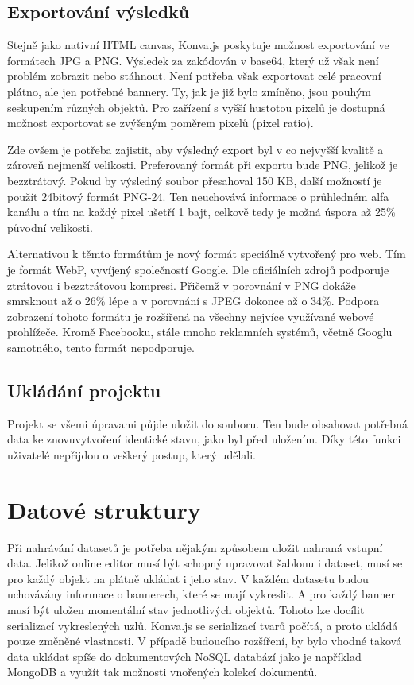         \subsection{Exportování výsledků}
        Stejně jako nativní HTML canvas, Konva.js poskytuje možnost exportování ve formátech JPG a PNG.
        Výsledek za zakódován v base64, který už však není problém zobrazit nebo stáhnout.
        Není potřeba však exportovat celé pracovní plátno, ale jen potřebné bannery. Ty, jak je již bylo zmíněno,
        jsou pouhým seskupením různých objektů. Pro zařízení s vyšší hustotou pixelů je dostupná možnost exportovat se zvýšeným poměrem pixelů (pixel ratio). 

        Zde ovšem je potřeba zajistit, aby výsledný export byl v co nejvyšší kvalitě a zároveň nejmenší velikosti.
        Preferovaný formát při exportu bude PNG, jelikož je bezztrátový. Pokud by výsledný soubor přesahoval 150 KB,
        další možností je použít 24bitový formát PNG-24.
        Ten neuchovává informace o průhledném alfa kanálu a tím na každý pixel ušetří 1 bajt, celkově tedy je možná úspora až 25\% původní velikosti. 

        Alternativou k těmto formátům je nový formát speciálně vytvořený pro web. Tím je formát WebP, vyvíjený společností Google.
        Dle oficiálních zdrojů podporuje ztrátovou i bezztrátovou kompresi. Přičemž v porovnání v PNG dokáže smrsknout až o 26\% lépe a v porovnání
        s JPEG dokonce až o 34\%. Podpora zobrazení tohoto formátu je rozšířená na všechny nejvíce využívané webové prohlížeče.
        Kromě Facebooku, stále mnoho reklamních systémů, včetně Googlu samotného, tento formát nepodporuje.

        \subsection{Ukládání projektu}
        Projekt se všemi úpravami půjde uložit do souboru. Ten bude obsahovat potřebná data ke znovuvytvoření identické stavu, jako byl před uložením.
        Díky této funkci uživatelé nepřijdou o veškerý postup, který udělali.

    \section{Datové struktury}
    Při nahrávání datasetů je potřeba nějakým způsobem uložit nahraná vstupní data. Jelikož online editor musí být schopný upravovat šablonu i dataset,
    musí se pro každý objekt na plátně ukládat i jeho stav. V každém datasetu budou uchovávány informace o bannerech, které se mají vykreslit.
    A pro každý banner musí být uložen momentální stav jednotlivých objektů. Tohoto lze docílit serializací vykreslených uzlů.
    Konva.js se serializací tvarů počítá, a proto ukládá pouze změněné vlastnosti. V případě budoucího rozšíření, by bylo vhodné taková data ukládat spíše do
    dokumentových NoSQL databází jako je například MongoDB a využít tak možnosti vnořených kolekcí dokumentů. 


